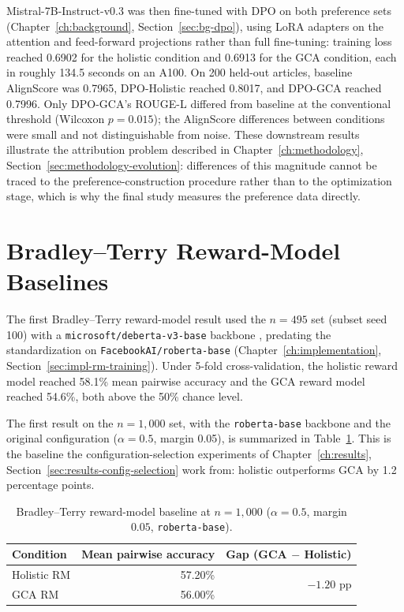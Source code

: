 Mistral-7B-Instruct-v0.3 was then fine-tuned with DPO on both preference sets
(Chapter~\ref{ch:background}, Section~\ref{sec:bg-dpo}), using LoRA adapters
\citep{hu2021lora} on the attention and feed-forward projections rather than
full fine-tuning: training loss reached
0.6902 for the holistic condition and 0.6913 for the GCA condition, each in
roughly 134.5 seconds on an A100. On 200 held-out articles, baseline AlignScore was
0.7965, DPO-Holistic reached 0.8017, and DPO-GCA reached 0.7996. Only DPO-GCA's
ROUGE-L differed from baseline at the conventional threshold (Wilcoxon
$p=0.015$); the AlignScore differences between conditions were small and not
distinguishable from noise. These downstream results illustrate the attribution
problem described in Chapter~\ref{ch:methodology},
Section~\ref{sec:methodology-evolution}: differences of this magnitude cannot be
traced to the preference-construction procedure rather than to the optimization
stage, which is why the final study measures the preference data directly.

\section{Bradley--Terry Reward-Model Baselines}
\label{sec:results-rm-baseline}

The first Bradley--Terry reward-model result used the $n=495$ set (subset seed
100) with a \texttt{microsoft/deberta-v3-base} backbone
\citep{he2021deberta}, predating the
standardization on \texttt{FacebookAI/roberta-base}
(Chapter~\ref{ch:implementation}, Section~\ref{sec:impl-rm-training}). Under 5-fold
cross-validation, the holistic reward model reached 58.1\% mean pairwise accuracy
and the GCA reward model reached 54.6\%, both above the 50\% chance level.

The first result on the $n=1{,}000$ set, with the \texttt{roberta-base} backbone
and the original configuration ($\alpha = 0.5$, margin 0.05), is summarized in
Table~\ref{tab:rm-baseline-1000}. This is the baseline the configuration-selection
experiments of Chapter~\ref{ch:results},
Section~\ref{sec:results-config-selection} work from: holistic outperforms GCA
by 1.2 percentage points.

\begin{table}[htbp]
\centering
\caption[Bradley--Terry reward-model baseline at $n=1{,}000$]{Bradley--Terry reward-model baseline at $n=1{,}000$ ($\alpha=0.5$,
margin $0.05$, \texttt{roberta-base}).}
\label{tab:rm-baseline-1000}
\begin{tabular}{lrr}
\toprule
Condition & Mean pairwise accuracy & Gap (GCA $-$ Holistic) \\
\midrule
Holistic RM & 57.20\% & \multirow{2}{*}{$-1.20$ pp} \\
GCA RM      & 56.00\% & \\
\bottomrule
\end{tabular}
\end{table}


